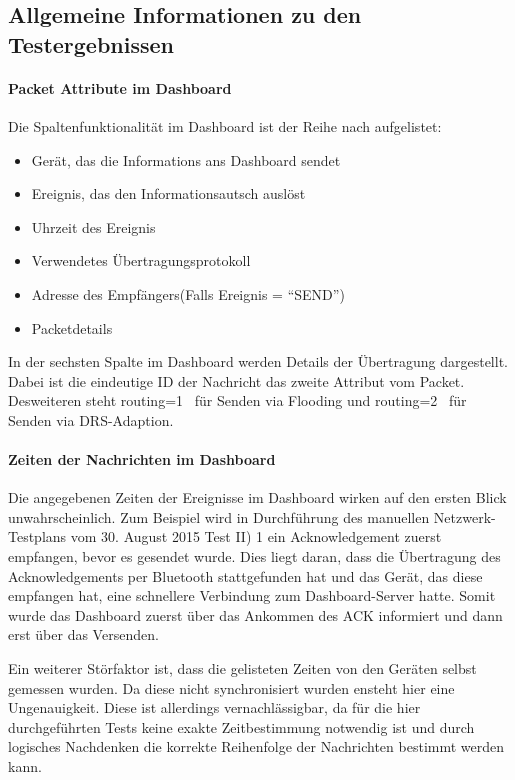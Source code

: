 \subsection{Allgemeine Informationen zu den Testergebnissen}

\paragraph{Packet Attribute im Dashboard}

Die Spaltenfunktionalität im Dashboard ist der Reihe nach aufgelistet:

\begin{itemize}
  \item Gerät, das die Informations ans Dashboard sendet
  \item Ereignis, das den Informationsautsch auslöst
  \item Uhrzeit des Ereignis
  \item Verwendetes Übertragungsprotokoll
  \item Adresse des Empfängers(Falls Ereignis = ``SEND'')
  \item Packetdetails
\end{itemize}

In der sechsten Spalte im Dashboard werden Details der Übertragung dargestellt. Dabei ist die eindeutige ID der Nachricht das zweite Attribut vom Packet. Desweiteren steht \glqq routing=1\grqq~ für Senden via Flooding und \glqq routing=2\grqq~ für Senden via DRS-Adaption.

\paragraph{Zeiten der Nachrichten im Dashboard}

Die angegebenen Zeiten der Ereignisse im Dashboard wirken auf den ersten Blick unwahrscheinlich. Zum Beispiel wird in Durchführung des manuellen Netzwerk-Testplans vom 30. August 2015 Test II) 1 ein Acknowledgement zuerst empfangen, bevor es gesendet wurde. Dies liegt daran, dass die Übertragung des Acknowledgements per Bluetooth stattgefunden hat und das Gerät, das diese empfangen hat, eine schnellere Verbindung zum Dashboard-Server hatte. Somit wurde das Dashboard zuerst über das Ankommen des ACK informiert und dann erst über das Versenden.

Ein weiterer Störfaktor ist, dass die gelisteten Zeiten von den Geräten selbst gemessen wurden. Da diese nicht synchronisiert wurden ensteht hier eine Ungenauigkeit. Diese ist allerdings vernachlässigbar, da für die hier durchgeführten Tests keine exakte Zeitbestimmung notwendig ist und durch logisches Nachdenken die korrekte Reihenfolge der Nachrichten bestimmt werden kann.
